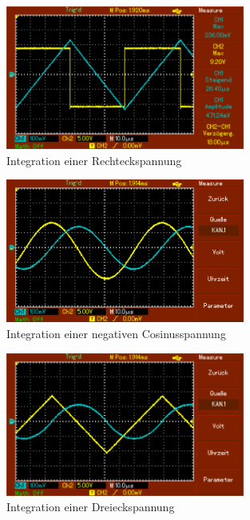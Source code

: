 \begin{figure}[h!]
	\centering
	\includegraphics[width=0.7\textwidth]{MAP002.png}
	\caption{Integration einer Rechteckspannung}
	\label{fig:integral1}
\end{figure} 

\begin{figure}[h!]
	\centering
	\includegraphics[width=0.7\textwidth]{MAP003.png}
	\caption{Integration einer negativen Cosinusspannung}
	\label{fig:integral2}
\end{figure} 

\begin{figure}[h!]
	\centering
	\includegraphics[width=0.7\textwidth]{MAP004.png}
	\caption{Integration einer Dreieckspannung}
	\label{fig:integral3}
\end{figure} 






	
